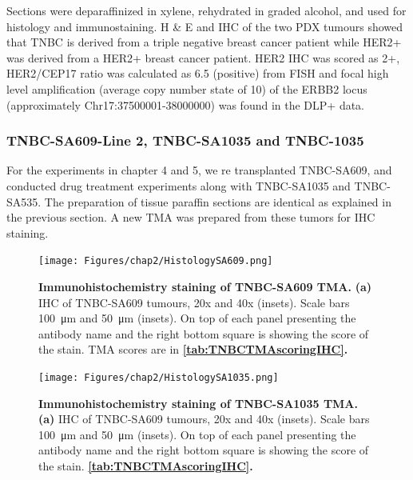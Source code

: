 Sections were deparaffinized in xylene, rehydrated in graded alcohol, and used for histology and immunostaining. 
H \& E and \ac{IHC}  of the two PDX tumours showed that TNBC is  derived from a triple negative breast cancer patient while HER2+ was derived from a HER2+ breast cancer patient. HER2 IHC was scored as 2+, HER2/CEP17 ratio was calculated as 6.5 (positive)\cite{ahn2020her2} from  \ac{FISH}  and focal high level amplification (average copy number state of 10) of the \ac{ERBB2} locus (approximately Chr17:37500001-38000000) was found in the DLP+ data.

\subsubsection{TNBC-SA609-Line 2, TNBC-SA1035 and TNBC-1035}
For the experiments in chapter 4 and 5, we re transplanted TNBC-SA609, and conducted drug treatment experiments along with TNBC-SA1035 and TNBC-SA535. The preparation of tissue paraffin sections are identical as explained in the previous section. A new TMA was prepared from these tumors for \ac{IHC} staining. 

 \begin{figure}
\centering
\texttt{[image: Figures/chap2/HistologySA609.png]}
	
\caption[]
	{\small
\textbf{Immunohistochemistry staining of TNBC-SA609 TMA.}
 \textbf{(a)} IHC of TNBC-SA609 tumours, 20x and 40x (insets). Scale bars \SI{100}{\micro\metre} and \SI{50}{\micro\metre} (insets). On top of each panel presenting the antibody name and the right bottom square is showing the score of the stain. TMA scores are in \textbf{\autoref{tab:TNBCTMAscoringIHC}.}}
	\label{fig:HistologySA609}
\end{figure}

 
 \begin{figure}
\centering
\texttt{[image: Figures/chap2/HistologySA1035.png]}
	
\caption[]
	{\small
\textbf{Immunohistochemistry staining of TNBC-SA1035 TMA.}
 \textbf{(a)} IHC of TNBC-SA609 tumours, 20x and 40x (insets). Scale bars \SI{100}{\micro\metre} and \SI{50}{\micro\metre} (insets). On top of each panel presenting the antibody name and the right bottom square is showing the score of the stain. \textbf{\autoref{tab:TNBCTMAscoringIHC}.}}
	\label{fig:HistologySA1035}
\end{figure}

